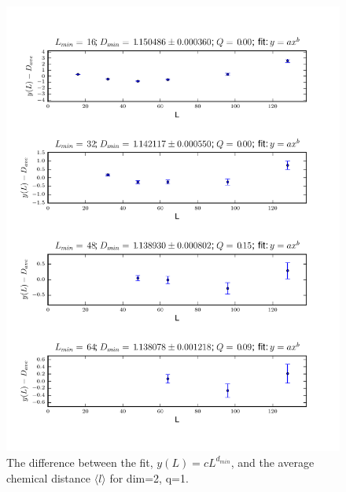 \documentclass[pre,preprint]{revtex4}
\newcommand{\lb}{{\langle}}
\newcommand{\rb}{{\rangle}}
\begin{document}
\begin{figure}[htp]
\centering
\includegraphics[width=.85\textwidth]{figures/d_min_D2q1_46_fig}
\caption{The difference between the fit, $y(L)=cL^{d_{min}}$, and the average chemical distance $\lb l \rb$ for dim=2, q=1.}\label{fig:1}
\end{figure}

\end{document}
